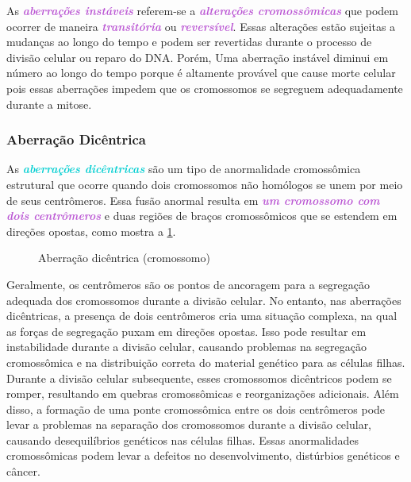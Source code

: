 \documentclass[11pt,a4paper]{article}
\begin{document}
	As \textcolor{MediumOrchid}{\textbf{\textit{aberrações instáveis}}} referem-se a \textcolor{MediumOrchid}{\textbf{\textit{alterações cromossômicas}}} que podem ocorrer de maneira \textcolor{MediumOrchid}{\textbf{\textit{transitória}}} ou \textcolor{MediumOrchid}{\textbf{\textit{reversível}}}. Essas alterações estão sujeitas a mudanças ao longo do tempo e podem ser revertidas durante o processo de divisão celular ou reparo do DNA. Porém, Uma aberração instável diminui em número ao longo do tempo porque é altamente provável que cause morte celular pois essas aberrações impedem que os cromossomos se segreguem adequadamente durante a mitose.

\subsubsection*{Aberração Dicêntrica}

	As \textcolor{DarkTurquoise}{\textbf{\textit{aberrações dicêntricas}}} são um tipo de anormalidade cromossômica estrutural que ocorre quando dois cromossomos não homólogos se unem por meio de seus centrômeros. Essa fusão anormal resulta em \textcolor{MediumOrchid}{\textbf{\textit{um cromossomo com dois centrômeros}}} e duas regiões de braços cromossômicos que se estendem em direções opostas, como mostra a \ref{fig:aberracaoDicentrica}. 

	\begin{figure}
		\caption{Aberração dicêntrica (cromossomo)}
		\label{fig:aberracaoDicentrica}
	\end{figure}
	
	Geralmente, os centrômeros são os pontos de ancoragem para a segregação adequada dos cromossomos durante a divisão celular. No entanto, nas aberrações dicêntricas, a presença de dois centrômeros cria uma situação complexa, na qual as forças de segregação puxam em direções opostas. Isso pode resultar em instabilidade durante a divisão celular, causando problemas na segregação cromossômica e na distribuição correta do material genético para as células filhas. Durante a divisão celular subsequente, esses cromossomos dicêntricos podem se romper, resultando em quebras cromossômicas e reorganizações adicionais. Além disso, a formação de uma ponte cromossômica entre os dois centrômeros pode levar a problemas na separação dos cromossomos durante a divisão celular, causando desequilíbrios genéticos nas células filhas. Essas anormalidades cromossômicas podem levar a defeitos no desenvolvimento, distúrbios genéticos e câncer.
\end{document}
